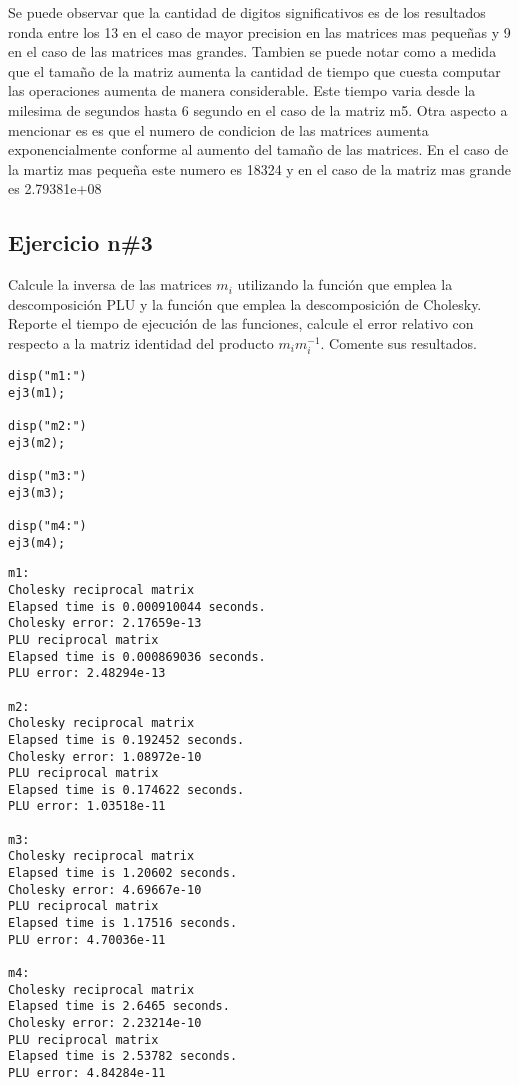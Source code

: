\documentclass[10pt]{article}
\begin{document}
Se puede observar que la cantidad de digitos significativos es de los resultados
ronda entre los 13 en el caso de mayor precision en las matrices mas pequeñas
y 9 en el caso de las matrices mas grandes. Tambien se puede notar como a medida
que el tamaño de la matriz aumenta la cantidad de tiempo que cuesta computar las
operaciones aumenta de manera considerable. Este tiempo varia desde la milesima de
segundos hasta 6 segundo en el caso de la matriz m5. Otra aspecto a mencionar es
es que el numero de condicion de las matrices aumenta exponencialmente conforme
al aumento del tamaño de las matrices. En el caso de la martiz mas pequeña este
numero es 18324 y en el caso de la matriz mas grande es 2.79381e+08



{}
\subsection*{Ejercicio n\#3}



Calcule la inversa de las matrices $m_i$ utilizando la función que emplea la
descomposición PLU y la función que emplea la descomposición de Cholesky.
Reporte el tiempo de ejecución de las funciones, calcule el error relativo
con respecto a la matriz identidad del producto $m_im_i^{-1}$. Comente sus resultados.

\begin{lstlisting}
disp("m1:")
ej3(m1);

disp("m2:")
ej3(m2);

disp("m3:")
ej3(m3);

disp("m4:")
ej3(m4);
\end{lstlisting}
\begin{lstlisting}[language={},xleftmargin=5pt,frame=none]
m1:
Cholesky reciprocal matrix
Elapsed time is 0.000910044 seconds.
Cholesky error: 2.17659e-13
PLU reciprocal matrix
Elapsed time is 0.000869036 seconds.
PLU error: 2.48294e-13
 
m2:
Cholesky reciprocal matrix
Elapsed time is 0.192452 seconds.
Cholesky error: 1.08972e-10
PLU reciprocal matrix
Elapsed time is 0.174622 seconds.
PLU error: 1.03518e-11
 
m3:
Cholesky reciprocal matrix
Elapsed time is 1.20602 seconds.
Cholesky error: 4.69667e-10
PLU reciprocal matrix
Elapsed time is 1.17516 seconds.
PLU error: 4.70036e-11
 
m4:
Cholesky reciprocal matrix
Elapsed time is 2.6465 seconds.
Cholesky error: 2.23214e-10
PLU reciprocal matrix
Elapsed time is 2.53782 seconds.
PLU error: 4.84284e-11
 

\end{lstlisting}
\end{document}
